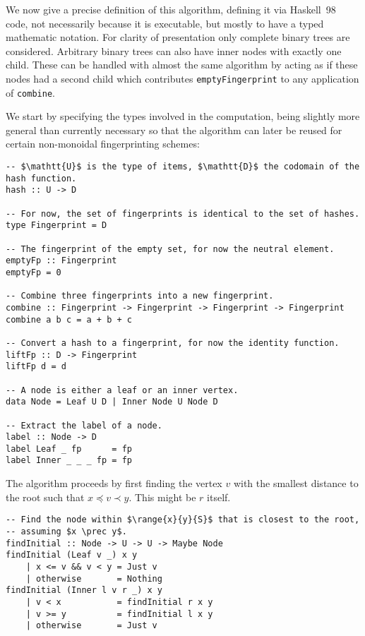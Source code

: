 We now give a precise definition of this algorithm, defining it via Haskell~98~\cite{jones2003haskell} code, not necessarily because it is executable, but mostly to have a typed mathematic notation. For clarity of presentation only complete binary trees are considered. Arbitrary binary trees can also have inner nodes with exactly one child. These can be handled with almost the same algorithm by acting as if these nodes had a second child which contributes \texttt{emptyFingerprint} to any application of \texttt{combine}.

We start by specifying the types involved in the computation, being slightly more general than currently necessary so that the algorithm can later be reused for certain non-monoidal fingerprinting schemes:

\begin{verbatim}
-- $\mathtt{U}$ is the type of items, $\mathtt{D}$ the codomain of the hash function.
hash :: U -> D

-- For now, the set of fingerprints is identical to the set of hashes.
type Fingerprint = D

-- The fingerprint of the empty set, for now the neutral element.
emptyFp :: Fingerprint
emptyFp = 0

-- Combine three fingerprints into a new fingerprint.
combine :: Fingerprint -> Fingerprint -> Fingerprint -> Fingerprint
combine a b c = a + b + c

-- Convert a hash to a fingerprint, for now the identity function.
liftFp :: D -> Fingerprint
liftFp d = d

-- A node is either a leaf or an inner vertex.
data Node = Leaf U D | Inner Node U Node D

-- Extract the label of a node.
label :: Node -> D
label Leaf _ fp      = fp
label Inner _ _ _ fp = fp
\end{verbatim}

The algorithm proceeds by first finding the vertex $v$ with the smallest distance to the root such that $x \preceq v \prec y$. This might be $r$ itself.

\begin{verbatim}
-- Find the node within $\range{x}{y}{S}$ that is closest to the root,
-- assuming $x \prec y$.
findInitial :: Node -> U -> U -> Maybe Node
findInitial (Leaf v _) x y
    | x <= v && v < y = Just v
    | otherwise       = Nothing
findInitial (Inner l v r _) x y
    | v < x           = findInitial r x y
    | v >= y          = findInitial l x y
    | otherwise       = Just v
\end{verbatim}

